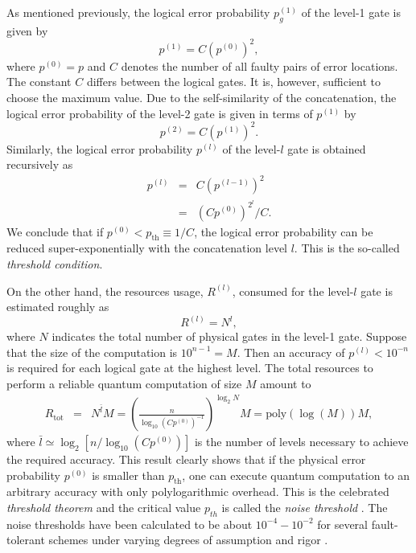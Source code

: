 As mentioned previously, the logical error probability $p_{g}^{(1)}$ of the level-1 gate is given by 
%
\begin{equation}
p^{(1)} = C (p^{(0)})^{2},
\end{equation}
%
where $p^{(0)}=p$ and $C$ denotes the number of all faulty pairs of error locations.
The constant $C$ differs between the logical gates.
It is, however, sufficient to choose the maximum value.
Due to the self-similarity of the concatenation, the logical error probability of the level-2 gate is given in terms of $p^{(1)}$ by 
%
\begin{equation}
p^{(2)} = C (p^{(1)})^{2}.
\end{equation}
%
Similarly, the logical error probability $p^{(l)}$ of the level-$l$ gate is obtained recursively as
%
\begin{eqnarray}
p^{(l)} &=& C (p^{(l-1)})^{2}
\nonumber \\
&=& (Cp^{(0)})^{2^{l}}/C.
\end{eqnarray}
%
We conclude that if $p^{(0)}<p_{\textrm{th}} \equiv 1/C$, the logical error probability can be reduced super-exponentially with the concatenation level $l$.
This is the so-called {\it threshold condition}.

On the other hand, the resources usage, $R^{(l)}$, consumed for the level-$l$ gate is estimated roughly as
%
\begin{equation}
R^{(l)}=N^{l},
\end{equation}
% 
where $N$ indicates the total number of physical gates in the level-1 gate.
Suppose that the size of the computation is $10^{n-1}=M$.
Then an accuracy of $p^{(l)} < 10^{-n}$ is required for each logical gate at the highest level. 
The total resources to perform a reliable quantum computation of size $M$ amount to 
%
\begin{eqnarray}
R_{\textrm{tot}}&=&N^{\bar{l}} M = \left( \frac{n}{\log _{10} (Cp^{(0)})^{-1}} \right)^{\log _{2} N}M = \textrm{poly}( \log (M))M,
\end{eqnarray}
%
where $\bar{l} \simeq \log _{2} \left[ n/\log _{10}(Cp^{(0)}) \right] $ is the number of levels necessary to achieve the required accuracy.
This result clearly shows that if the physical error probability $p^{(0)}$ is smaller than $p_{\textrm{th}}$, one can execute quantum computation to an arbitrary accuracy with only polylogarithmic overhead.
This is the celebrated {\it threshold theorem} and the critical value $p_{th}$ is called the {\it noise threshold} \cite{NielsenChuang,Kitaev97,Knill98a,Knill98b,Aharonov97}. 
The noise thresholds have been calculated to be about $10^{-4}-10^{-2}$ for several fault-tolerant schemes under varying degrees of assumption and rigor
\cite{Knill98a,Knill98b,Aharonov97,Aharonov08,Steane03,KnillNature,Aliferis06,Aliferis07,Aliferis08,Aliferis09,Steane99,Cross09}.
